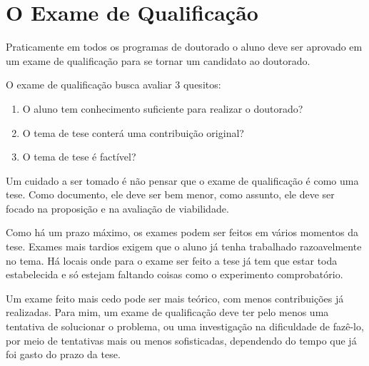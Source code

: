 \chapter{O Exame de Qualificação}

Praticamente em todos os programas de doutorado o aluno deve ser aprovado em um exame de qualificação para se tornar um candidato ao doutorado.

O exame de qualificação busca avaliar 3 quesitos:

\begin{enumerate}
\item	O aluno tem conhecimento suficiente para realizar o doutorado?
\item	O tema de tese conterá uma contribuição original?
\item	O tema de tese é factível?
\end{enumerate}

Um cuidado a ser tomado é não pensar que o exame de qualificação é como uma tese. Como documento, ele deve ser bem menor, como assunto, ele deve ser focado na proposição e na avaliação de viabilidade.

Como há um prazo máximo, os exames podem ser feitos em vários momentos da tese. Exames mais tardios exigem que o aluno já tenha trabalhado razoavelmente no tema. Há locais onde para o exame ser feito a tese já tem que estar toda estabelecida e só estejam faltando coisas como o experimento comprobatório.

Um exame feito mais cedo pode ser mais teórico, com menos contribuições já realizadas.
Para mim, um exame de qualificação deve ter pelo menos uma tentativa de solucionar o problema, ou uma investigação na dificuldade de fazê-lo, por meio de tentativas mais ou menos sofisticadas, dependendo do tempo que já foi gasto do prazo da tese.
